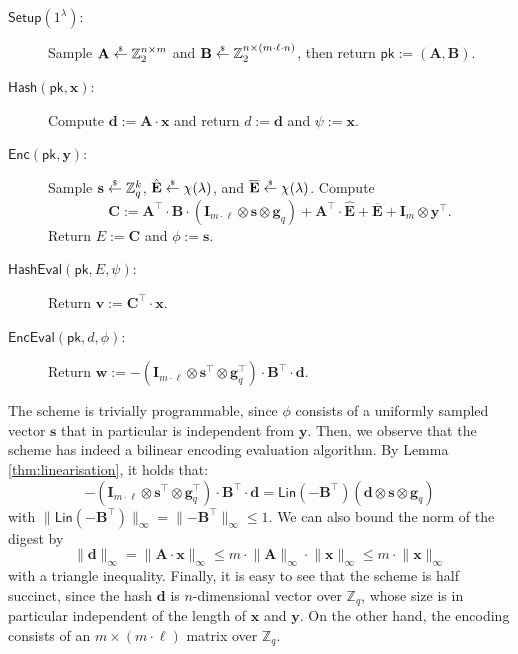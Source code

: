 \documentclass{theoretics}
\newcommand{\getsr}{\overset{\raisebox{-1pt}{$\scriptscriptstyle \$$}}{\gets}}
\newcommand{\sample}{\getsr}
\newcommand{\Z}{\mathbb{Z}}
\renewcommand{\sec}{\ensuremath{\lambda}}
\newcommand{\secpar}{\sec}
\newcommand{\algofont}[1]{\ensuremath{\mathsf{#1}}}
\newcommand{\Enc}{{\algofont{Enc}}}
\newcommand{\Setup}{{\algofont{Setup}}}
\newcommand{\Eval}{\algofont{Eval}\xspace}
\newcommand{\Hash}{{\algofont{Hash}}}
\newcommand{\id}{\ensuremath{\mathbf{I}}}
\newcommand{\pk}{{\mathsf{pk}}}
\newenvironment{protocol}[1][]
{\begin{algorithm}\caption{#1}}
  {\end{algorithm}}
\begin{document}
\begin{protocol}[Half-Succinct NI-OTE]\label{prot:HCVOLE}

\begin{description}
\item[$\Setup(1^\secpar)$:] Sample $\mathbf{A} \sample \Z_2^{n \times m}$ and $\mathbf{B} \sample \Z_2^{n\times (m \cdot \ell\cdot n)}$, then return $\pk:=(\mathbf{A}, \mathbf{B})$.


\item[$\Hash(\pk, \mathbf{x})$:] Compute $\mathbf{d}:= \mathbf{A}\cdot \mathbf{x}$ and return $d:=\mathbf{d}$ and $\psi:=\mathbf{x}$.


\item[$\Enc(\pk, \mathbf{y})$:] Sample $\mathbf{s}\sample \Z_q^k$, $\hat{\mathbf{E}}\sample\chi(\sec)$, 
and $\overline{\mathbf{E}}\sample\chi(\sec)$. Compute 
\[\mathbf{C}:= \mathbf{A}^\intercal \cdot \mathbf{B}\cdot (\id_{m\cdot \ell}\otimes \mathbf{s}\otimes \mathbf{g}_q)+ \mathbf{A}^\intercal\cdot \hat{\mathbf{E}}+ \overline{\mathbf{E}}+ \id_{m} \otimes \mathbf{y}^\intercal.\]
Return $E:=\mathbf{C}$ and $\phi:=\mathbf{s}$.


\item[$\Hash\Eval(\pk, E, \psi)$:] Return $\mathbf{v}:=\mathbf{C}^\intercal\cdot \mathbf{x}$.

\item[$\Enc\Eval(\pk, d, \phi)$:] Return $\mathbf{w}:= -(\id_{m\cdot \ell}\otimes \mathbf{s}^\intercal\otimes \mathbf{g}_q^\intercal) \cdot \mathbf{B}^\intercal\cdot \mathbf{d}$.
\end{description}
\end{protocol}
The scheme is trivially programmable, since $\phi$ consists of a uniformly sampled vector $\mathbf{s}$ that in particular is independent from $\mathbf{y}$.
Then, we observe that the scheme has indeed a bilinear encoding evaluation algorithm. By Lemma \ref{thm:linearisation}, it holds that:
\begin{equation}\label{eq:bilinear}
-(\id_{m\cdot \ell}\otimes \mathbf{s}^\intercal\otimes \mathbf{g}_q^\intercal) \cdot \mathbf{B}^\intercal\cdot \mathbf{d} 
=
\mathsf{Lin}(-\mathbf{B}^\intercal) (\mathbf{d}\otimes \mathbf{s}\otimes \mathbf{g}_q)
\end{equation}
with $\lVert \mathsf{Lin}(-\mathbf{B}^\intercal)\rVert_\infty=\lVert -\mathbf{B}^\intercal\rVert_\infty\le 1$. We can also bound the norm of the digest by 
\begin{equation}\label{eq:bound_d}
    \lVert \mathbf{d}\rVert_\infty=\lVert \mathbf{A}\cdot \mathbf{x}\rVert_\infty\le m\cdot \lVert \mathbf{A}\rVert_\infty\cdot \lVert \mathbf{x}\rVert_\infty\le m\cdot \lVert \mathbf{x}\rVert_\infty
\end{equation}
with a triangle inequality. Finally, it is easy to see that the scheme is half succinct, since the hash $\mathbf{d}$ is $n$-dimensional vector over $\Z_q$, whose size is in particular independent of the length of $\mathbf{x}$ and $\mathbf{y}$. On the other hand, the encoding consists of an $m\times (m\cdot \ell)$ matrix over $\Z_q$. 
\end{document}
